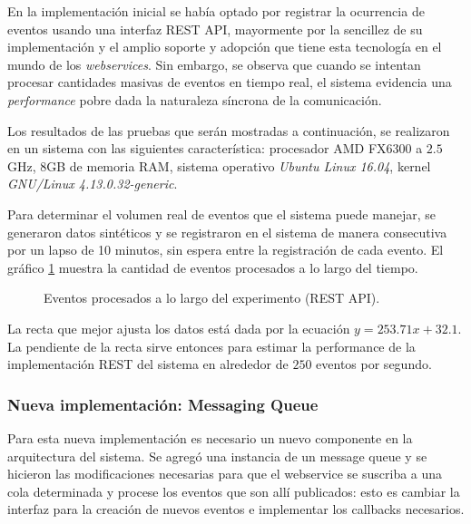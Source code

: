 \documentclass[a4paper,10pt, oneside]{article}
\begin{document}
En la implementación inicial se había optado por registrar la ocurrencia de eventos usando una interfaz REST API, mayormente por la sencillez de su implementación y el amplio soporte y adopción que tiene esta tecnología en el mundo de los \textit{webservices}. Sin embargo, se observa que cuando se intentan procesar cantidades masivas de eventos en tiempo real, el sistema evidencia una \textit{performance} pobre dada la naturaleza síncrona de la comunicación.

Los resultados de las pruebas que serán mostradas a continuación, se realizaron en un sistema con las siguientes característica: procesador AMD FX6300 a $2.5$ GHz, 8GB de memoria RAM, sistema operativo \textit{Ubuntu Linux 16.04}, kernel \textit{GNU/Linux 4.13.0.32-generic}.

Para determinar el volumen real de eventos que el sistema puede manejar, se generaron datos sintéticos y se registraron en el sistema de manera consecutiva por un lapso de 10 minutos, sin espera entre la registración de cada evento. El gráfico \ref{fig:REST} muestra la cantidad de eventos procesados a lo largo del tiempo.

\begin{figure}[htpb]
	\centering

\caption{Eventos procesados a lo largo del experimento (REST API).} \label{fig:REST}
\end{figure}

La recta que mejor ajusta los datos está dada por la ecuación $y = 253.71 x + 32.1$. La pendiente de la recta sirve entonces para estimar la performance de la implementación REST del sistema en alrededor de $250$ eventos por segundo.

\subsubsection{Nueva implementación: Messaging Queue}
Para esta nueva implementación es necesario un nuevo componente en la arquitectura del sistema. Se agregó una instancia de un message queue y se hicieron las modificaciones necesarias para que el webservice se suscriba a una cola determinada y procese los eventos que son allí publicados: esto es cambiar la interfaz para la creación de nuevos eventos e implementar los callbacks necesarios.
\end{document}
